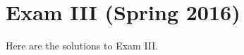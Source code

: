 \chapter{Exam III (Spring 2016)}
Here are the solutions to Exam III.

\begin{problem}
\end{problem}

\begin{problem}
\end{problem}

\begin{problem}
\end{problem}

\begin{problem}
\end{problem}

\begin{problem}
\end{problem}

\begin{problem}
\end{problem}

\begin{problem}
\end{problem}

\begin{problem}
\end{problem}

\begin{problem}
\end{problem}

\begin{problem}
\end{problem}

\begin{problem}
\end{problem}

\begin{problem}
\end{problem}

